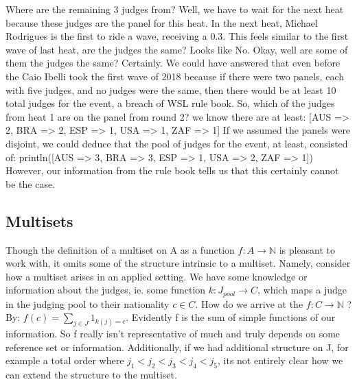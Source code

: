\documentclass{article}
\theoremstyle{definition}
\begin{document}
Where are the remaining 3 judges from? Well, we have to wait for the next heat because these judges are the panel for this heat. In the next heat, Michael Rodrigues is the first to ride a wave, receiving a 0.3.
This feels similar to the first wave of last heat, are the judges the same?
Looks like No. Okay, well are some of them the judges the same? Certainly. We could have answered that even before the Caio Ibelli took the first wave of 2018 because if there were two panels, each with five judges, and no judges were the same, then there would be at least 10 total judges for the event, a breach of WSL rule book. So, which of the judges from heat 1 are on the panel from round 2?
we know there are at least:
[AUS => 2, BRA => 2, ESP => 1, USA => 1, ZAF => 1]
 If we assumed the panels were disjoint, we could deduce that the pool of judges for the event, at least, consisted of:
println([AUS => 3, BRA => 3, ESP => 1, USA => 2, ZAF => 1])
However, our information from the rule book tells us that this certainly cannot be the case.

\subsection{Multisets}
Though the definition of a multiset on A as a function $f:A\rightarrow\mathbb{N}$ is pleasant to work with, it omits some of the structure intrinsic to a multiset. Namely, consider how a multiset arises in an applied setting. We have some knowledge or information about the judges, ie. some function $k: J_{pool} → C$, which maps a judge in the judging pool to their nationality $c\in C$. How do we arrive at the $f:C\rightarrow\mathbb{N}$ ? By: $f(c) = \sum_{j\in J} 1_{k(j)=c}$. Evidently f is the sum of simple functions of our information. So f really isn't representative of much and truly depends on some reference set or information. Additionally, if we had additional structure on J, for example a total order where $j_1<j_2<j_3 <j_4<j_5$, its not entirely clear how we can extend the structure to the multiset.
\end{document}

